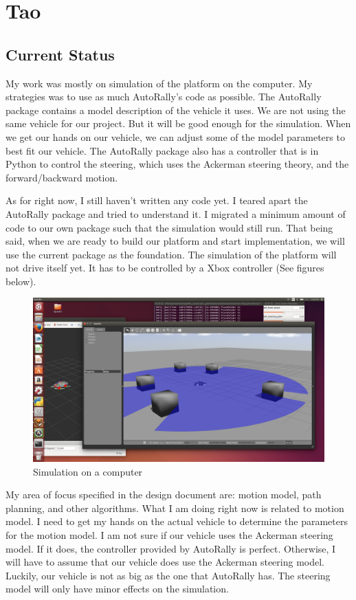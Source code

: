 \documentclass[compsoc,draftclsnofoot,onecolumn,10pt]{IEEEtran}
\begin{document}
\section{Tao}
\subsection{Current Status}
My work was mostly on simulation of the platform on the computer. My strategies was to use as much AutoRally's code as possible. The AutoRally package contains a model description of the vehicle it uses. We are not using the same vehicle for our project. But it will be good enough for the simulation. When we get our hands on our vehicle, we can adjust some of the model parameters to best fit our vehicle. The AutoRally package also has a controller that is in Python to control the steering, which uses the Ackerman steering theory, and the forward/backward motion. \par     

As for right now, I still haven't written any code yet. I teared apart the AutoRally package and tried to understand it. I migrated a minimum amount of code to our own package such that the simulation would still run. That being said, when we are ready to build our platform and start implementation, we will use the current package as the foundation. The simulation of the platform will not drive itself yet. It has to be controlled by a Xbox controller (See figures below). \par 

\begin{figure}
  \centering
 \includegraphics[width=\textwidth]{arc_prog_report_Tao_3.png}
  \caption{Simulation on a computer}
\end{figure}

My area of focus specified in the design document are: motion model, path planning, and other algorithms. What I am doing right now is related to motion model. I need to get my hands on the actual vehicle to determine the parameters for the motion model. I am not sure if our vehicle uses the Ackerman steering model. If it does, the controller provided by AutoRally is perfect. Otherwise, I will have to assume that our vehicle does use the Ackerman steering model. Luckily, our vehicle is not as big as the one that AutoRally has. The steering model will only have minor effects on the simulation. 
\end{document}
